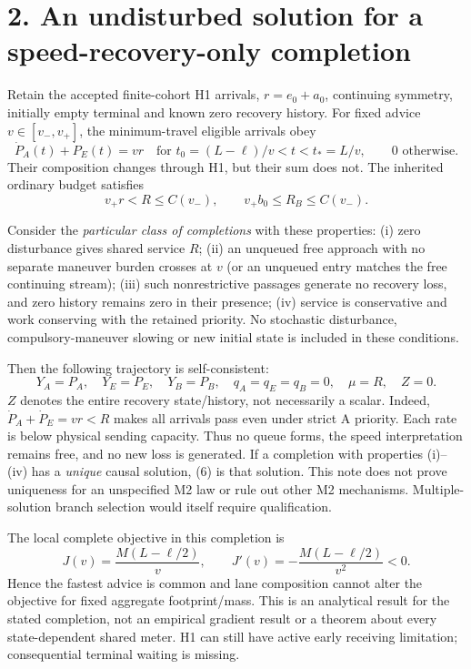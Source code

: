 \documentclass[11pt,a4paper]{article}
\begin{document}
\newpage
\section*{2. An undisturbed solution for a speed-recovery-only completion}

Retain the accepted finite-cohort H1 arrivals, $r=e_0+a_0$, continuing
symmetry, initially empty terminal and known zero recovery history.
For fixed advice $v\in[v_-,v_+]$, the minimum-travel eligible arrivals obey
\begin{equation}
 \dot P_A(t)+\dot P_E(t)=vr
 \quad\text{for }t_0=(L-\ell)/v<t<t_*=L/v,
 \qquad 0\text{ otherwise}.
 \tag{4}
\end{equation}
Their composition changes through H1, but their sum does not. The inherited
ordinary budget satisfies
\begin{equation}
 v_+r<R\leq C(v_-),\qquad v_+b_0\leq R_B\leq C(v_-).
 \tag{5}
\end{equation}

Consider the \emph{particular class of completions} with these properties:
(i) zero disturbance gives shared service $R$;
(ii) an unqueued free approach with no separate maneuver burden crosses
at $v$ (or an unqueued entry matches the free continuing stream);
(iii) such nonrestrictive passages generate no recovery loss, and zero
history remains zero in their presence;
(iv) service is conservative and work conserving with the retained priority.
No stochastic disturbance, compulsory-maneuver slowing or new initial state
is included in these conditions.

Then the following trajectory is self-consistent:
\begin{equation}
 Y_A=P_A,\quad Y_E=P_E,\quad Y_B=P_B,\quad
 q_A=q_E=q_B=0,\quad \mu=R,\quad Z=0.
 \tag{6}
\end{equation}
$Z$ denotes the entire recovery state/history, not necessarily a scalar.
Indeed, $\dot P_A+\dot P_E=vr<R$ makes all arrivals pass even under strict
A priority. Each rate is below physical sending capacity. Thus no queue
forms, the speed interpretation remains free, and no new loss is generated.
If a completion with properties (i)--(iv) has a \emph{unique} causal solution,
(6) is that solution. This note does not prove uniqueness for an unspecified
M2 law or rule out other M2 mechanisms. Multiple-solution branch selection
would itself require qualification.

The local complete objective in this completion is
\begin{equation}
 J(v)=\frac{M(L-\ell/2)}{v},\qquad
 J'(v)=-\frac{M(L-\ell/2)}{v^2}<0.
 \tag{7}
\end{equation}
Hence the fastest advice is common and lane composition cannot alter the
objective for fixed aggregate footprint/mass. This is an analytical result
for the stated completion, not an empirical gradient result or a theorem
about every state-dependent shared meter. H1 can still have active early
receiving limitation; consequential terminal waiting is missing.
\end{document}
